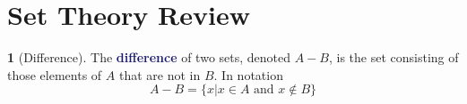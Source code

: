 \documentclass[11pt]{article}
\numberwithin{equation}{section}
\newcommand{\navy}[1]{\textcolor{MidnightBlue}{\bf #1}}
\theoremstyle{plain}
\theoremstyle{definition}
\newtheorem{definition}{\color{MidnightBlue}{\textbf{Definition}}}[section]
\newtheorem*{solution}{\color{Goldenrod}Solution}
\newtheorem{exercise}{\color{YellowOrange}Exercise}[section]
\newcommand{\1}{\mathbbm 1}
\newcommand{\tT}{\mathcal T}
\begin{document}


\appendix

\section{Set Theory Review}

\begin{definition}[Difference]
	The \navy{difference} of two sets, denoted $A-B$, is the set consisting of those elements of $A$ that are not in $B$. In notation
	\begin{equation*}
		A - B = \{x | x \in A \text{ and } x \not\in B\}	
	\end{equation*}
\end{definition}
\end{document}
